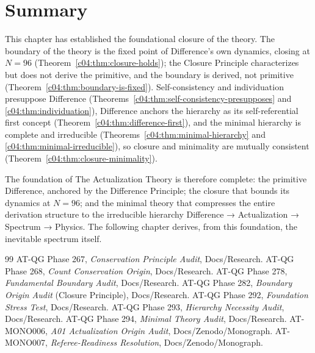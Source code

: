\section{Summary}
\label{c04:sec:closure-summary}

This chapter has established the foundational closure of the theory. The boundary of the
theory is the fixed point of Difference's own dynamics, closing at $N=96$
(Theorem~\ref{c04:thm:closure-holds}); the Closure Principle characterizes but does not
derive the primitive, and the boundary is derived, not primitive
(Theorem~\ref{c04:thm:boundary-is-fixed}). Self-consistency and individuation presuppose
Difference (Theorems~\ref{c04:thm:self-consistency-presupposes} and
\ref{c04:thm:individuation}), Difference anchors the hierarchy as its self-referential first
concept (Theorem~\ref{c04:thm:difference-first}), and the minimal hierarchy is complete and
irreducible (Theorems~\ref{c04:thm:minimal-hierarchy} and \ref{c04:thm:minimal-irreducible}),
so closure and minimality are mutually consistent (Theorem~\ref{c04:thm:closure-minimality}).

The foundation of The Actualization Theory is therefore complete: the primitive Difference,
anchored by the Difference Principle; the closure that bounds its dynamics at $N=96$; and
the minimal theory that compresses the entire derivation structure to the irreducible
hierarchy Difference → Actualization → Spectrum → Physics. The following chapter derives,
from this foundation, the inevitable spectrum itself.

\begin{thebibliography}{99}
 AT-QG Phase 267, \emph{Conservation Principle Audit}, Docs/Research.
 AT-QG Phase 268, \emph{Count Conservation Origin}, Docs/Research.
 AT-QG Phase 278, \emph{Fundamental Boundary Audit}, Docs/Research.
 AT-QG Phase 282, \emph{Boundary Origin Audit} (Closure Principle), Docs/Research.
 AT-QG Phase 292, \emph{Foundation Stress Test}, Docs/Research.
 AT-QG Phase 293, \emph{Hierarchy Necessity Audit}, Docs/Research.
 AT-QG Phase 294, \emph{Minimal Theory Audit}, Docs/Research.
 AT-MONO006, \emph{A01 Actualization Origin Audit}, Docs/Zenodo/Monograph.
 AT-MONO007, \emph{Referee-Readiness Resolution}, Docs/Zenodo/Monograph.
\end{thebibliography}
